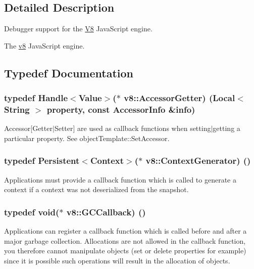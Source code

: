 \subsection{Detailed Description}
Debugger support for the \hyperlink{classv8_1_1_v8}{V8} Java\+Script engine.

The \hyperlink{namespacev8}{v8} Java\+Script engine. 

\subsection{Typedef Documentation}
\hypertarget{namespacev8_a3016fe071826349d1370a700e71be094}{}
\subsubsection[{Accessor\+Getter}]{\setlength{\rightskip}{0pt plus 5cm}typedef {\bf Handle}$<${\bf Value}$>$($\ast$ v8\+::\+Accessor\+Getter) ({\bf Local}$<$ {\bf String} $>$ property, const {\bf Accessor\+Info} \&info)}\label{namespacev8_a3016fe071826349d1370a700e71be094}
Accessor\mbox{[}Getter$\vert$\+Setter\mbox{]} are used as callback functions when setting$\vert$getting a particular property. See object\+Template\+::\+Set\+Accessor. \hypertarget{namespacev8_a7218225c425a91cdcff3ec9130fb4ed4}{}
\subsubsection[{Context\+Generator}]{\setlength{\rightskip}{0pt plus 5cm}typedef {\bf Persistent}$<${\bf Context}$>$($\ast$ v8\+::\+Context\+Generator) ()}\label{namespacev8_a7218225c425a91cdcff3ec9130fb4ed4}
Applications must provide a callback function which is called to generate a context if a context was not deserialized from the snapshot. \hypertarget{namespacev8_a226458957ce3c253b9a9f539bb5ddad4}{}
\subsubsection[{G\+C\+Callback}]{\setlength{\rightskip}{0pt plus 5cm}typedef void($\ast$ v8\+::\+G\+C\+Callback) ()}\label{namespacev8_a226458957ce3c253b9a9f539bb5ddad4}
Applications can register a callback function which is called before and after a major garbage collection. Allocations are not allowed in the callback function, you therefore cannot manipulate objects (set or delete properties for example) since it is possible such operations will result in the allocation of objects. \hypertarget{namespacev8_a3a7c18d62a0d1f2d12845051920be592}{}
